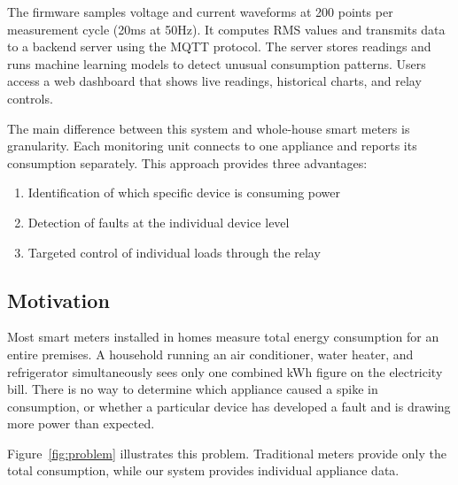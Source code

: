 \documentclass[12pt, a4paper]{article}
\begin{document}
	The firmware samples voltage and current waveforms at 200 points per measurement cycle (20ms at 50Hz). It computes RMS values and transmits data to a backend server using the MQTT protocol. The server stores readings and runs machine learning models to detect unusual consumption patterns. Users access a web dashboard that shows live readings, historical charts, and relay controls.
	
	The main difference between this system and whole-house smart meters is granularity. Each monitoring unit connects to one appliance and reports its consumption separately. This approach provides three advantages:
	
	\begin{enumerate}[itemsep=3pt, topsep=6pt]
		\item Identification of which specific device is consuming power
		\item Detection of faults at the individual device level
		\item Targeted control of individual loads through the relay
	\end{enumerate}
	
	\newpage
	
	\subsection{Motivation}
	
	Most smart meters installed in homes measure total energy consumption for an entire premises. A household running an air conditioner, water heater, and refrigerator simultaneously sees only one combined kWh figure on the electricity bill. There is no way to determine which appliance caused a spike in consumption, or whether a particular device has developed a fault and is drawing more power than expected.
	
	Figure~\ref{fig:problem} illustrates this problem. Traditional meters provide only the total consumption, while our system provides individual appliance data.
	
\end{document}
